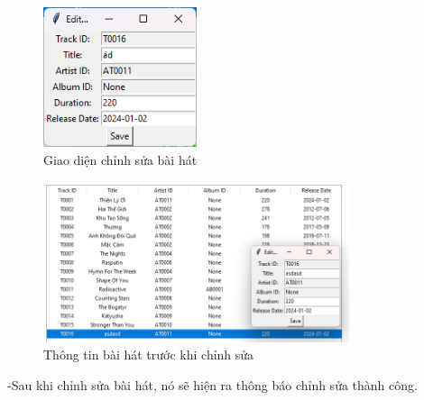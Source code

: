 \documentclass[a4paper]{article}
\begin{document}
\begin{flushleft}
	\begin{figure}
		\centering
		\includegraphics[width=0.4\textwidth]{images/editform.png}
		\caption{Giao diện chỉnh sửa bài hát}
	\end{figure}
	\begin{figure}[h]
		\centering
		\includegraphics[width=0.8\textwidth]{images/beforeediting.png}
		\caption{Thông tin bài hát trước khi chỉnh sửa}
	\end{figure}
	-Sau khi chỉnh sửa bài hát, nó sẽ hiện ra thông báo chỉnh sửa thành công.
\end{flushleft}
\clearpage
\newpage
\end{document}
